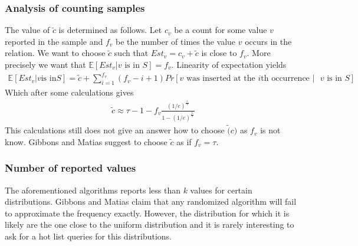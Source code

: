 \subsubsection{Analysis of counting samples}
The value of $\widetilde{c}$ is determined as follows. Let $c_v$ be a
count for some value $v$ reported in the sample and $f_v$ be the
number of times the value $v$ occurs in the relation. We want to choose
$\widetilde{c}$ such that $Est_v = c_v + \widetilde{c}$ is close to
$f_v$. More precisely we want that $\mathbb{E}[Est_v | v\text{ is in }S] = f_v$. Linearity of
expectation yields
\begin{align*}
  \mathbb{E}[Est_v | v \text{is in} S] = \widetilde{c} + \sum_{i = 1} ^ {f_v}
  (f_v - i + 1) Pr[v \text{ was inserted at the $i$th occurrence $|$ $v$ is
  in $S$}]
\end{align*}
Which after some calculations gives
\begin{align*}
  \widetilde{c} \approx \tau - 1 - f_v \frac{(1/e)^{\frac{f_v}
      {\tau}}} {1 - (1/e)^{\frac{f_v}{\tau}}}
\end{align*}
This calculations still does not give an answer how to choose
$\widetilde(c)$ as $f_v$ is not know. Gibbons and Matias suggest to
choose $\widetilde{c}$ as if $f_v = \tau$.

\subsubsection{Number of reported values}
The aforementioned algorithms reports less than $k$ values for certain
distributions. Gibbons and Matias claim that any randomized algorithm
will fail to approximate the frequency exactly. However, the
distribution for which it is likely are the one close to the uniform
distribution and it is rarely interesting to ask for a hot list
queries for this distributions.
